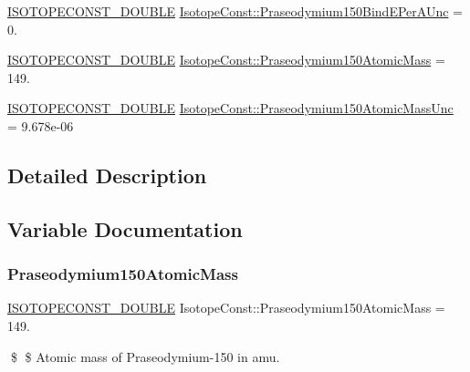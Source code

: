 \begin{DoxyCompactItemize}
\item 
\mbox{\hyperlink{group___isotope_const-_macros_ga8f45a7272ce02c0b4c65c44636ed719a}{I\+S\+O\+T\+O\+P\+E\+C\+O\+N\+S\+T\+\_\+\+D\+O\+U\+B\+LE}} \mbox{\hyperlink{group___isotope_const-_praseodymium-_pr150_ga85bf1223d50ae6cd027b661ba9347dbb}{Isotope\+Const\+::\+Praseodymium150\+Bind\+E\+Per\+A\+Unc}} = 0.
\item 
\mbox{\hyperlink{group___isotope_const-_macros_ga8f45a7272ce02c0b4c65c44636ed719a}{I\+S\+O\+T\+O\+P\+E\+C\+O\+N\+S\+T\+\_\+\+D\+O\+U\+B\+LE}} \mbox{\hyperlink{group___isotope_const-_praseodymium-_pr150_gae367c590dc15f1a1c289c1509640c43c}{Isotope\+Const\+::\+Praseodymium150\+Atomic\+Mass}} = 149.
\item 
\mbox{\hyperlink{group___isotope_const-_macros_ga8f45a7272ce02c0b4c65c44636ed719a}{I\+S\+O\+T\+O\+P\+E\+C\+O\+N\+S\+T\+\_\+\+D\+O\+U\+B\+LE}} \mbox{\hyperlink{group___isotope_const-_praseodymium-_pr150_ga201bbf0ddf4e529b0ed72183fd4ffaab}{Isotope\+Const\+::\+Praseodymium150\+Atomic\+Mass\+Unc}} = 9.\+678e-\/06
\end{DoxyCompactItemize}


\subsection{Detailed Description}


\subsection{Variable Documentation}
\mbox{\label{group___isotope_const-_praseodymium-_pr150_gae367c590dc15f1a1c289c1509640c43c}} 
\subsubsection{\texorpdfstring{Praseodymium150\+Atomic\+Mass}{Praseodymium150AtomicMass}}
{\footnotesize\ttfamily \mbox{\hyperlink{group___isotope_const-_macros_ga8f45a7272ce02c0b4c65c44636ed719a}{I\+S\+O\+T\+O\+P\+E\+C\+O\+N\+S\+T\+\_\+\+D\+O\+U\+B\+LE}} Isotope\+Const\+::\+Praseodymium150\+Atomic\+Mass = 149.}

\$ \$ Atomic mass of Praseodymium-\/150 in amu. \mbox{\label{group___isotope_const-_praseodymium-_pr150_ga201bbf0ddf4e529b0ed72183fd4ffaab}} 
